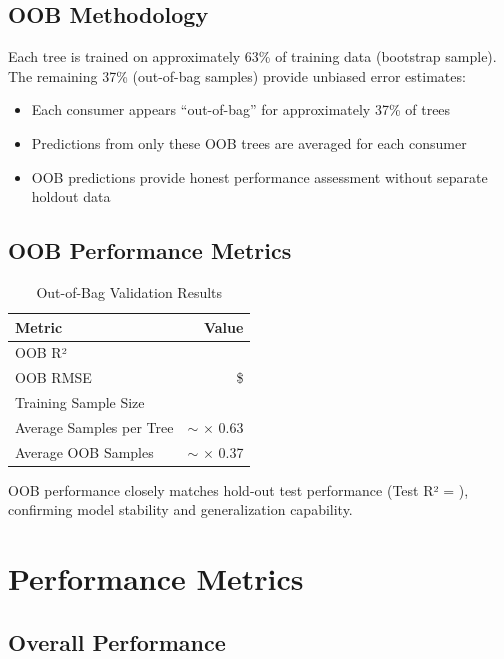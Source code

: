 \subsection{OOB Methodology}

Each tree is trained on approximately 63\% of training data (bootstrap sample). The remaining 37\% (out-of-bag samples) provide unbiased error estimates:

\begin{itemize}
    \item Each consumer appears ``out-of-bag'' for approximately 37\% of trees
    \item Predictions from only these OOB trees are averaged for each consumer
    \item OOB predictions provide honest performance assessment without separate holdout data
\end{itemize}

\subsection{OOB Performance Metrics}

\begin{table}[h]
\centering
\caption{Out-of-Bag Validation Results}
\begin{tabular}{lr}
\toprule
\textbf{Metric} & \textbf{Value} \\
\midrule
OOB R² & \ModelNineOOBRSquared{} \\
OOB RMSE & \$\ModelNineOOBError{} \\
Training Sample Size & \ModelNineTrainingSamples{} \\
Average Samples per Tree & $\sim$\ModelNineTrainingSamples{} $\times$ 0.63 \\
Average OOB Samples & $\sim$\ModelNineTrainingSamples{} $\times$ 0.37 \\
\bottomrule
\end{tabular}
\label{tab:model9_oob}
\end{table}

OOB performance closely matches hold-out test performance (Test R² = \ModelNineRSquaredTest{}), confirming model stability and generalization capability.

\section{Performance Metrics}

\subsection{Overall Performance}

